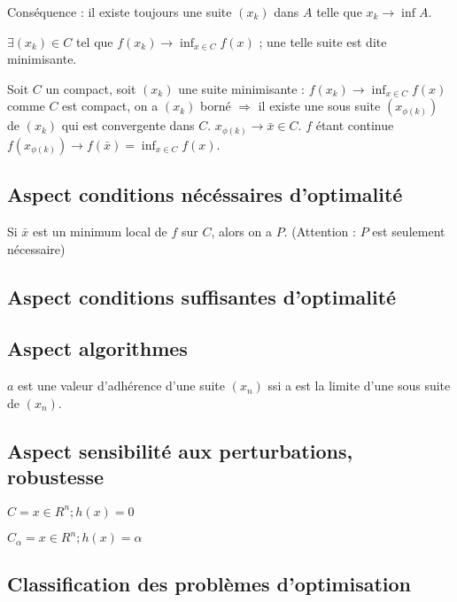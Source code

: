 	Conséquence : il existe toujours une suite $(x_k)$ dans $A$ telle que $x_k \rightarrow \inf A$.
	
	\begin{definition} $\exists (x_k) \in C$ tel que $\displaystyle f(x_k) \rightarrow \inf_{x \in C} f(x)$ ; une telle suite est dite minimisante.
	\end{definition}
	
	Soit $C$ un compact, soit $(x_k)$ une suite minimisante : $f(x_k) \rightarrow \inf_{x \in C} f(x)$ comme $C$ est compact, on a $(x_k)$ borné $\Rightarrow$ il existe une sous suite $(x_{\phi(k)})$ de $(x_k)$ qui est convergente dans $C$. $x_{\phi(k)} \rightarrow \bar{x} \in C$. $f$ étant continue $f(x_{\phi(k)}) \rightarrow f(\bar{x}) = \inf_{x \in C} f(x)$.
	
	\subsection{Aspect \og conditions nécéssaires d'optimalité\fg}
	
	Si $\bar{x}$ est un minimum local de $f$ sur $C$, alors on a $P$. (Attention : $P$ est seulement nécessaire)
	
	\subsection{Aspect \og conditions suffisantes d'optimalité\fg}
	
	\subsection{Aspect \og algorithmes \fg}
	
	$a$ est une valeur d'adhérence d'une suite $(x_n)$ ssi a est la limite d'une sous suite de $(x_n)$.
	
	\subsection{Aspect \og sensibilité aux perturbations, robustesse \fg}
	
	$C = {x\in R^n ; h(x) = 0}$
	
	$C_\alpha = {x\in R^n ; h(x) = \alpha}$
	
	\subsection{Classification des problèmes d'optimisation}
	
